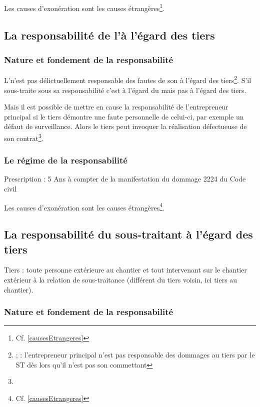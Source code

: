 			Les causes d’exonération sont les causes étrangères\footnote{Cf. \vref{causesEtrangeres}}.



	\subsection{La responsabilité de l'\ep à l'égard des tiers}

		\subsubsection{Nature et fondement de la responsabilité}

			L’\ep n’est pas délictuellement responsable des fautes de son \ST à l’égard des tiers\footnote{ ;  : l’entrepreneur principal n’est pas responsable des dommages au tiers par le ST dès lors qu’il n’est pas son commettant}. S’il sous-traite sous sa responsabilité c’est à l’égard du \MO mais pas à l’égard des tiers.


			Mais il est possible de mettre en cause la responsabilité de l’entrepreneur principal si le tiers démontre une faute personnelle de celui-ci, par exemple un défaut de surveillance. Alors le tiers peut invoquer la réalisation défectueuse de son contrat\footnote{}.


		\subsubsection{Le régime de la responsabilité}

			Prescription : 5 Ans à compter de la manifestation du dommage 2224 du Code civil

			Les causes d’exonération sont les causes étrangères\footnote{Cf. \ref{causesEtrangeres}}.

	\subsection{La responsabilité du sous-traitant à l'égard des tiers}

		Tiers : toute personne extérieure au chantier et tout intervenant sur le chantier extérieur à la relation de sous-traitance (différent du tiers voisin, ici tiers au chantier).

		\subsubsection{Nature et fondement de la responsabilité}

